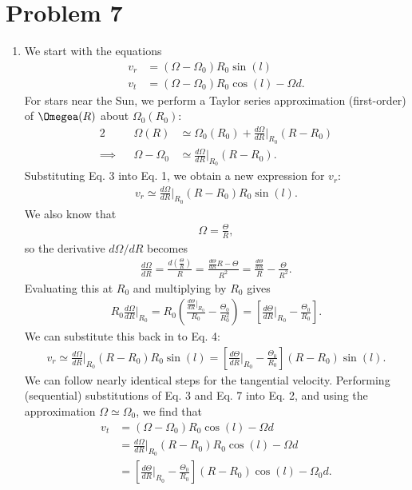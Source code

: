 \documentclass[11pt,letterpaper]{article}
\begin{document}
\section*{Problem 7} 
\begin{enumerate}[label=(\alph*)]
    \item We start with the equations 
        \begin{align}
            v_r &= (\Omega - \Omega_0)R_0\sin(l) \\
            v_t &= (\Omega - \Omega_0)R_0\cos(l) - \Omega d.
        \end{align}
        For stars near the Sun, we perform a Taylor series approximation (first-order) of $\Omegea(R)$ about $\Omega_0(R_0)$:
        \begin{alignat}{2}
            &&\Omega(R) &\simeq \Omega_0(R_0) + \frac{d\Omega}{dR}\Big|_{R_0}(R-R_0) \nonumber \\
            \implies&&\Omega - \Omega_0 &\simeq \frac{d\Omega}{dR}\Big|_{R_0}(R-R_0).
        \end{alignat}
        Substituting Eq. 3 into Eq. 1, we obtain a new expression for $v_r$:
        \begin{align}
            v_r \simeq \frac{d\Omega}{dR}\Big|_{R_0}(R-R_0)R_0\sin(l).
        \end{align}
        We also know that 
        \begin{align}
            \Omega = \frac{\Theta}{R},
        \end{align}
        so the derivative $d\Omega/dR$ becomes
        \begin{align}
            \frac{d\Omega}{dR} = \frac{d(\frac{\Theta}{R})}{R} = \frac{\frac{d\Theta}{dR}R - \Theta}{R^2} = \frac{\frac{d\Theta}{dR}}{R} - \frac{\Theta}{R^2}.
        \end{align}
        Evaluating this at $R_0$ and multiplying by $R_0$ gives 
        \begin{align}
            R_0\frac{d\Omega}{dR}\Big|_{R_0} = R_0(\frac{\frac{d\Theta}{dR}\Big|_{R_0}}{R_0} - \frac{\Theta_0}{R_0^2}) = \left[\frac{d\Theta}{dR}\Big|_{R_0} - \frac{\Theta_0}{R_0}\right].
        \end{align}
        We can substitute this back in to Eq. 4:
        \begin{align}
            v_r \simeq \frac{d\Omega}{dR}\Big|_{R_0}(R-R_0)R_0\sin(l) = \left[\frac{d\Theta}{dR}\Big|_{R_0} - \frac{\Theta_0}{R_0}\right](R-R_0)\sin(l).
        \end{align}
        We can follow nearly identical steps for the tangential velocity. Performing (sequential) substitutions of Eq. 3 and Eq. 7 into Eq. 2, and using the approximation $\Omega \simeq \Omega_0$, we find that 
        \begin{align}
            v_t &= (\Omega - \Omega_0)R_0\cos(l) - \Omega d \\
            &= \frac{d\Omega}{dR}\Big|_{R_0}(R-R_0)R_0\cos(l) - \Omega d \\
            &= \left[\frac{d\Theta}{dR}\Big|_{R_0} - \frac{\Theta_0}{R_0}\right](R-R_0)\cos(l) - \Omega_0 d.
        \end{align}
    

\end{enumerate}
\end{document}
